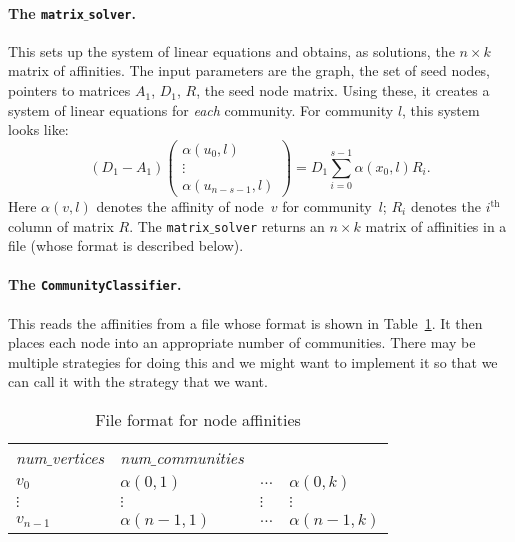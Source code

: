 \documentclass[12pt]{article}
\renewcommand{\th}{\ensuremath{^{\mathrm{th}}}}
\begin{document}
\paragraph{The \texttt{matrix$\_$solver}.} This sets up the system of 
linear equations and obtains, as solutions, the $n \times k$ matrix 
of affinities. The input parameters are the graph, the set of seed nodes, 
pointers to matrices $A_1$, $D_1$, $R$, the seed node matrix. Using these, 
it creates a system of linear equations for \emph{each} community.   
For community $l$, this system looks like:
\[
	(D_1 -  A_1) \begin{pmatrix} \alpha(u_0, l) \\ \vdots \\ \alpha(u_{n - s -1}, l) \end{pmatrix}	
		= D_1 \sum_{i = 0}^{s - 1} \alpha(x_0, l) R_i. 
\] 
Here $\alpha(v, l)$ denotes the affinity of node~$v$ for community~$l$; $R_i$ 
denotes the $i\th$ column of matrix $R$. The \texttt{matrix$\_$solver} returns 
an $n \times k$ matrix of affinities in a file (whose format is described below).

\paragraph{The \texttt{CommunityClassifier}.} This reads the affinities 
from a file whose format is shown in Table~\ref{tab:node_aff}.
It then places each node into an appropriate number of communities. There 
may be multiple strategies for doing this and we might want to implement it 
so that we can call it with the strategy that we want.  

\begin{table}[ht]
\centering
\begin{tabular}{llll}
\emph{num$\_$vertices} & \emph{num$\_$communities} &  & \\
$v_0$               & $\alpha(0, 1)$ & $\ldots$ & $\alpha(0, k)$ \\
$\vdots$ & $\vdots$ & $\vdots$ & $\vdots$ \\
$v_{n-1}$  & $\alpha(n-1, 1)$ & $\ldots$ & $\alpha(n-1, k)$ 
\end{tabular}
\caption{File format for node affinities}\label{tab:node_aff}
\end{table}
%
\end{document}
